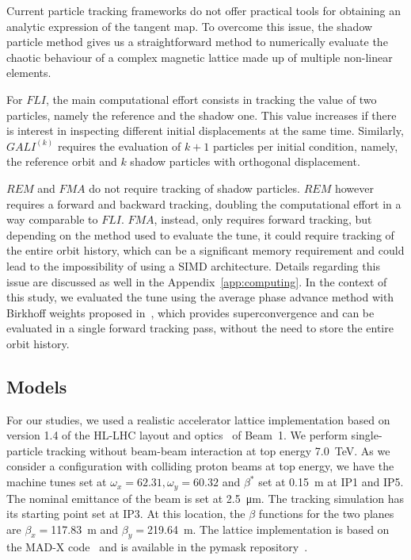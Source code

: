 Current particle tracking frameworks do not offer practical tools for obtaining an analytic expression of the tangent map. To overcome this issue, the shadow particle method gives us a straightforward method to numerically evaluate the chaotic behaviour of a complex magnetic lattice made up of multiple non-linear elements.

For $FLI$, the main computational effort consists in tracking the value of two particles, namely the reference and the shadow one. This value increases if there is interest in inspecting different initial displacements at the same time. Similarly, $GALI^{(k)}$ requires the evaluation of $k+1$ particles per initial condition, namely, the reference orbit and $k$ shadow particles with orthogonal displacement.

$REM$ and $FMA$ do not require tracking of shadow particles. $REM$ however requires a forward and backward tracking, doubling the computational effort in a way comparable to $FLI$. $FMA$, instead, only requires forward tracking, but depending on the method used to evaluate the tune, it could require tracking of the entire orbit history, which can be a significant memory requirement and could lead to the impossibility of using a SIMD architecture. Details regarding this issue are discussed as well in the Appendix~\ref{app:computing}. In the context of this study, we evaluated the tune using the average phase advance method with Birkhoff weights proposed in~\cite{russo:ipac2021-thpab189}, which provides superconvergence and can be evaluated in a single forward tracking pass, without the need to store the entire orbit history.

\subsection{Models} \label{sec:model}
%
For our studies, we used a realistic accelerator lattice implementation based on version 1.4 of the HL-LHC layout and optics~\cite{Maria_2019} of Beam~1. We perform single-particle tracking without beam-beam interaction at top energy \SI{7.0}{TeV}. As we consider a configuration with colliding proton beams at top energy, we have the machine tunes set at $\omega_x=62.31, \omega_y=60.32$ and $\beta^\ast$ set at \SI{0.15}{\meter} at IP1 and IP5. The nominal emittance of the beam is set at \SI{2.5}{\micro \meter}. The tracking simulation has its starting point set at IP3. At this location, the $\beta$ functions for the two planes are $\beta_x=$\SI{117.83}{\meter} and $\beta_y=$\SI{219.64}{\meter}. The lattice implementation is based on the MAD-X code~\cite{madx} and is available in the pymask repository~\cite{pymask}.

